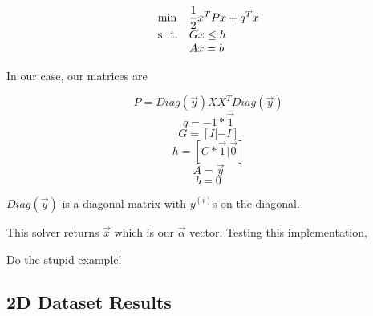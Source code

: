 \documentclass[10pt,twoside]{article}
\begin{document}
\begin{equation}
\begin{array}{ll@{}ll}
\text{min}  & \displaystyle \frac{1}{2} x^T P x + q^T x &\\
\text{s. t.}& \displaystyle G x \leq h &\\
& Ax = b
\end{array}
\end{equation}

In our case, our matrices are 

\begin{equation*}
P = Diag(\overrightarrow{y}) X X^T Diag(\overrightarrow{y})
\end{equation*}
\begin{equation*}
q = -1 * \overrightarrow{1}
\end{equation*}
\begin{equation*}
G = [I | -I]
\end{equation*}
\begin{equation*}
h = [C * \overrightarrow{1} | \overrightarrow{0}]
\end{equation*}
\begin{equation*}
A = \overrightarrow{y}
\end{equation*}
\begin{equation*}
b = 0
\end{equation*}

$Diag(\overrightarrow{y})$ is a diagonal matrix with $y^{(i)}$s on the diagonal.

This solver returns $\overrightarrow{x}$ which is our $\overrightarrow{\alpha}$ vector. Testing this implementation,

Do the stupid example!

\subsection{2D Dataset Results}
\end{document}
